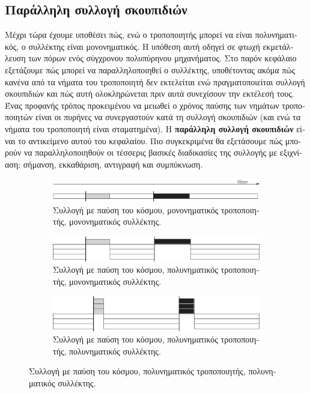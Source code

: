\begin{greek}

\chapter{Παράλληλη συλλογή σκουπιδιών}\label{ch:par}
Μέχρι τώρα έχουμε υποθέσει πώς, ενώ ο τροποποιητής μπορεί να
είναι πολυνηματικός, ο συλλέκτης είναι μονονηματικός. Η υπόθεση
αυτή οδηγεί σε φτωχή εκμετάλλευση των πόρων ενός σύγχρονου
πολυπύρηνου μηχανήματος. Στο παρόν κεφάλαιο εξετάζουμε πώς
μπορεί να παραλληλοποιηθεί ο συλλέκτης, υποθέτοντας ακόμα πώς
κανένα από τα νήματα του τροποποιητή δεν εκτελείται ενώ
πραγματοποιείται συλλογή σκουπιδιών και πώς αυτή ολοκληρώνεται
πριν αυτά συνεχίσουν την εκτέλεσή τους. Ένας προφανής τρόπος
προκειμένου να μειωθεί ο χρόνος παύσης των νημάτων τροποποιητών
είναι οι πυρήνες να συνεργαστούν κατά τη συλλογή σκουπιδιών
(και ενώ τα νήματα του τροποποιητή είναι σταματημένα). Η 
\textbf{παράλληλη συλλογή σκουπιδιών} είναι το αντικείμενο
αυτού του κεφαλαίου. Πιο συγκεκριμένα θα εξετάσουμε πώς μπορούν
να παραλληλοποιηθούν οι τέσσερις βασικές διαδικασίες της συλλογής
με εξιχνίαση: σήμανση, εκκαθάριση, αντιγραφή και συμπύκνωση.

\begin{figure}[H]
  \centering
  \begin{subfigure}{1.0\textwidth}
    \includegraphics{figures/par_1a}
    \caption
      {Συλλογή με παύση του κόσμου, μονονηματικός τροποποιητής, 
       μονονηματικός συλλέκτης.}
  \end{subfigure}

  \begin{subfigure}[b]{1.0\textwidth}
    \includegraphics{figures/par_1b}
    \caption
      {Συλλογή με παύση του κόσμου, πολυνηματικός τροποποιητής,
       μονονηματικός συλλέκτης.}
  \end{subfigure}
  
  \begin{subfigure}[b]{1.0\textwidth}
    \includegraphics{figures/par_1c}
    \caption
      {Συλλογή με παύση του κόσμου, πολυνηματικός τροποποιητής,
       πολυνηματικός συλλέκτης.}
  \end{subfigure}
  

\end{figure}
\end{greek}
